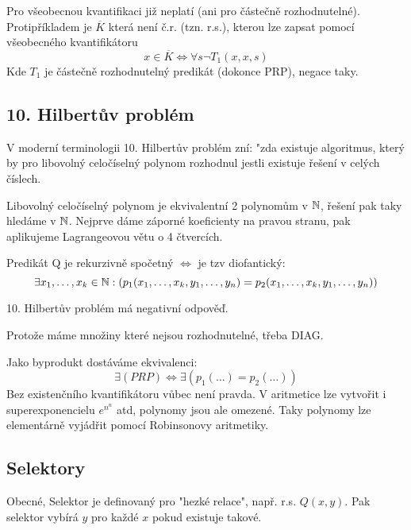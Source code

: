 \begin{note}
	Pro všeobecnou kvantifikaci již neplatí (ani pro částečně rozhodnutelné).
	Protipříkladem je $\overline{K}$ která není č.r. (tzn. r.s.), kterou lze zapsat pomocí všeobecného kvantifikátoru
	\[ x \in \overline{K} \iff \forall s \neg T_1(x, x, s) \]
	Kde $T_1$ je částečně rozhodnutelný predikát (dokonce PRP), negace taky.
\end{note}

\subsection{10. Hilbertův problém}

V moderní terminologii 10. Hilbertův problém zní: "zda existuje algoritmus, který by pro libovolný celočíselný polynom rozhodnul jestli existuje řešení v celých číslech.

Libovolný celočíselný polynom je ekvivalentní 2 polynomům v $\operatorname{\mathbb{N}}$, řešení pak taky hledáme v $\operatorname{\mathbb{N}}$.
Nejprve dáme záporné koeficienty na pravou stranu, pak aplikujeme Lagrangeovou větu o 4 čtvercích.

\begin{theorem}[RDPM (BD)]\label{rdpm}
	Predikát Q je rekurzivně spočetný $\iff$ je tzv diofantický:
		\[ \exists x_1, \ldots, x_k \in \operatorname{\mathbb{N}}: (p_1(x_1, \ldots, x_k, y_1, \ldots, y_n) = p_2(x_1, \ldots, x_k, y_1, \ldots, y_n)) \]
\end{theorem}

\begin{consequence}
	10. Hilbertův problém má negativní odpověď.

	Protože máme množiny které nejsou rozhodnutelné, třeba DIAG.
\end{consequence}

\begin{amendment}\label{rdpm_am}
	Jako byprodukt dostáváme ekvivalenci:
	\[ \exists(PRP) \iff \exists(p_1(\ldots) = p_2(\ldots)) \]
	Bez existenčního kvantifikátoru vůbec není pravda.
	V aritmetice lze vytvořit i superexponencielu $e^{n^n}$ atd, polynomy jsou ale omezené.
	Taky polynomy lze elementárně vyjádřit pomocí Robinsonovy aritmetiky.
\end{amendment}

\subsection{Selektory}

Obecné, Selektor je definovaný pro "hezké relace", např. r.s. $Q(x, y)$.
Pak selektor vybírá $y$ pro každé $x$ pokud existuje takové.

